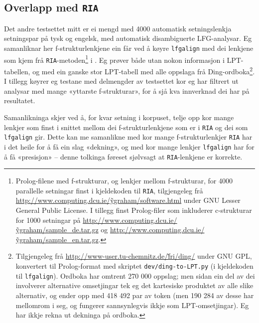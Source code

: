 \documentclass[12pt,a4paper,oneside,draft]{report}
\begin{document}
\subsection{Overlapp med \texttt{RIA}}
\label{sec-5.3.2}

\label{SEC:ria}

Det andre testsettet mitt er ei mengd med 4000 automatisk
 setningslenkja setningspar på tysk og engelsk, med automatisk
 disambiguerte LFG-analysar. Eg samanliknar her f\hyp{}strukturlenkjene ein
 får ved å køyre \texttt{lfgalign} med dei lenkjene som kjem frå
 \texttt{RIA}-metoden\footnote{Prolog-filene med f\hyp{}strukturar, og lenkjer mellom
        f\hyp{}strukturar, for 4000 parallelle setningar finst i
        kjeldekoden til \texttt{RIA}, tilgjengeleg frå
        \href{http://www.computing.dcu.ie/~ygraham/software.html}{http://www.computing.dcu.ie/\~ygraham/software.html} under GNU
        Lesser General Public License. I tillegg finst Prolog-filer
        som inkluderer c\hyp{}strukturar for 1000 setningar på
        \href{http://www.computing.dcu.ie/~ygraham/sample_de.tar.gz}{http://www.computing.dcu.ie/\~ygraham/sample\_de.tar.gz} og
        \href{http://www.computing.dcu.ie/~ygraham/sample_en.tar.gz}{http://www.computing.dcu.ie/\~ygraham/sample\_en.tar.gz}. } i \citet{graham2009osr,graham2009fts}. Eg prøver
 både utan nokon informasjon i LPT-tabellen, og med ein ganske stor
 LPT-tabell med alle oppslaga frå Ding-ordboka\footnote{Tilgjengeleg frå \href{http://www-user.tu-chemnitz.de/~fri/ding/}{http://www-user.tu-chemnitz.de/\~fri/ding/}
        under GNU GPL, konvertert til Prolog-format med skriptet
        \texttt{dev/ding-to-LPT.py} (i kjeldekoden til \texttt{lfgalign}).  Ordboka
        har omtrent 270 000 oppslag; men sidan ein del av dei
        involverer alternative omsetjingar tek eg det kartesiske
        produktet av alle slike alternativ, og ender opp med 418 492
        par av token (men 190 284 av desse har mellomrom i seg, og
        fungerer sannsynlegvis ikkje som LPT-omsetjingar). Eg har
        ikkje rekna ut dekninga på ordboka. }. I tillegg
 køyrer eg testane med delmengder av testsettet kor eg har filtrert ut
 analysar med mange «yttarste f\hyp{}strukturar», for å sjå kva innverknad
 dei har på resultatet.

Samanlikninga skjer ved å, for kvar setning i korpuset, telje opp kor
 mange lenkjer som finst i snittet mellom dei f\hyp{}strukturlenkjene som
 er i \texttt{RIA} og dei som \texttt{lfgalign} gir. Dette kan me samanlikne med kor
 mange f\hyp{}strukturlenkjer \texttt{RIA} har i det heile for å få ein slag
 «dekning», og med kor mange lenkjer \texttt{lfgalign} har for å få
 «presisjon» -- denne tolkinga føreset sjølvsagt at \texttt{RIA}-lenkjene er
 korrekte.
\end{document}
